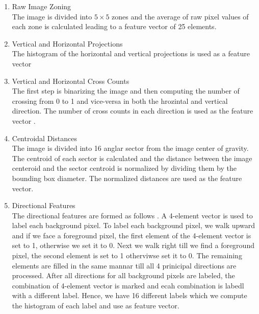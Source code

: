 \documentclass[conference]{IEEEtran}
\begin{document}
\begin{enumerate}
  \item Raw Image Zoning \\
  The image is divided into $5\times5$ zones and the average of raw pixel values of each zone is calculated leading to a feature vector of 25 elements\cite{Trier1996}.

	\item Vertical and Horizontal Projections \\
	The histogram of the horizontal and vertical projections is used as a feature vector \cite{Trier1996}

	\item Vertical and Horizontal Cross Counts \\
	The first step is binarizing the image and then computing the number of crossing from 0 to 1 and vice-versa in  both the hrozintal and vertical direction. The number of cross counts in each direction is used as the feature vector . %
	\item  Centroidal Distances \\
	The image is divided into 16 anglar sector from the image center of gravity. The centroid of each sector is calculated and the distance between the image centeroid and the sector centroid is normalized by dividing them by the bounding box diameter\cite{ElSherif2007}.  The normalized distances are used as the feature vector.

\item Directional Features\\
The directional features are formed as follows \cite{ElSherif2007}. A 4-element vector is used to label each background pixel. To label each background pixel, we walk upward and if we face a foreground pixel, the first element of the 4-element vector is set to 1, otherwise we set it to 0. Next we walk right till we find a foreground pixel, the second element is set to 1 otherviwse set it to 0. The remaining elements are filled in the same mannar till all 4 prinicipal directions are processed. After all directions for all background pixels are labeled, the combination of 4-element vector is marked and ecah combination is labedl with a different label. Hence, we have 16 different labels which we compute the histogram of each label and use as feature vector.


\end{enumerate}
\end{document}
